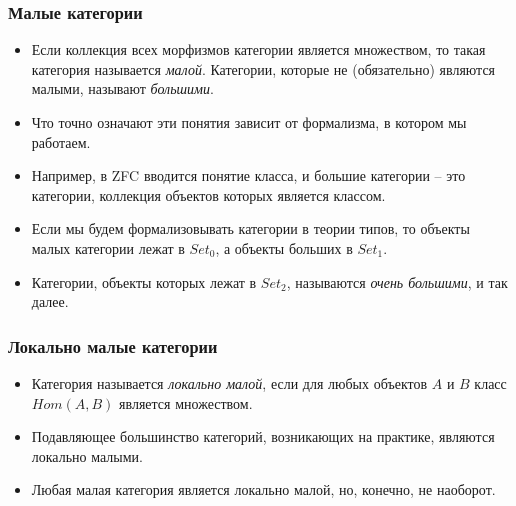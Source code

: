 \documentclass{beamer}
\begin{document}
\begin{frame}
\frametitle{Малые категории}
\begin{itemize}
\item Если коллекция всех морфизмов категории является множеством, то такая категория называется \emph{малой}.
Категории, которые не (обязательно) являются малыми, называют \emph{большими}.
\item Что точно означают эти понятия зависит от формализма, в котором мы работаем.
\item Например, в ZFC вводится понятие класса, и большие категории -- это категории, коллекция объектов которых является классом.
\item Если мы будем формализовывать категории в теории типов, то объекты малых категории лежат в $Set_0$, а объекты больших в $Set_1$.
\item Категории, объекты которых лежат в $Set_2$, называются \emph{очень большими}, и так далее.
\end{itemize}
\end{frame}

\begin{frame}
\frametitle{Локально малые категории}
\begin{itemize}
\item Категория называется \emph{локально малой}, если для любых объектов $A$ и $B$ класс $Hom(A,B)$ является множеством.
\item Подавляющее большинство категорий, возникающих на практике, являются локально малыми.
\item Любая малая категория является локально малой, но, конечно, не наоборот.
\end{itemize}
\end{frame}
\end{document}
